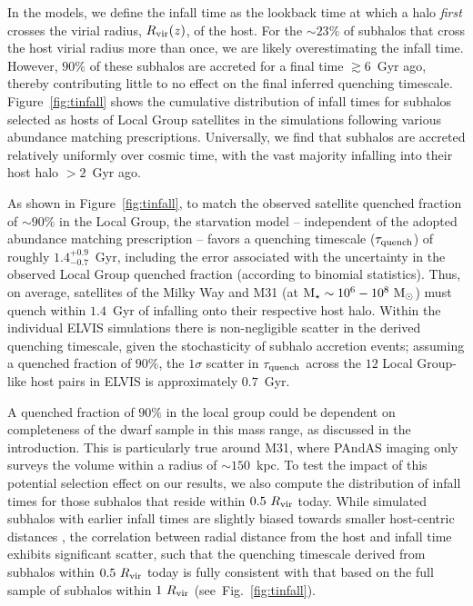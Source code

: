 In the models, we define the infall time as the lookback time at which
a halo \emph{first} crosses the virial radius, $R_{\rm vir}(z)$, of
the host. For the $\sim 23\%$ of subhalos that cross the host virial
radius more than once, we are likely overestimating the infall
time. However, $90\%$ of these subhalos are accreted for a final time
$\gtrsim6$~Gyr ago, thereby contributing little to no effect on the
final inferred quenching timescale. Figure~\ref{fig:tinfall} shows the
cumulative distribution of infall times for subhalos selected as hosts
of Local Group satellites in the simulations following various
abundance matching prescriptions. Universally, we find that subhalos
are accreted relatively uniformly over cosmic time, with the vast
majority infalling into their host halo $>2$~Gyr ago.





As shown in Figure~\ref{fig:tinfall}, to match the observed satellite
quenched fraction of $\sim90\%$ in the Local Group, the starvation
model -- independent of the adopted abundance matching prescription --
favors a quenching timescale ($\tau_{\rm quench}$) of roughly
$1.4^{+0.9}_{-0.7}$~Gyr, including the error associated with the
uncertainty in the observed Local Group quenched fraction (according
to binomial statistics). Thus, on average, satellites of the Milky Way
and M31 (at ${\rm M}_{\star} \sim 10^{6}-10^{8}~{\rm M}_{\odot}$) must quench within
$1.4$~Gyr of infalling onto their respective host halo. Within the
individual ELVIS simulations there is non-negligible scatter in the
derived quenching timescale, given the stochasticity of subhalo
accretion events; assuming a quenched fraction of $90\%$, the
$1\sigma$ scatter in $\tau_{\rm quench}$ across the $12$ Local
Group-like host pairs in ELVIS is approximately $0.7$~Gyr.
  


A quenched fraction of $90\%$ in the local group could be dependent on
completeness of the dwarf sample in this mass range, as discussed in
the introduction. This is particularly true around M31, where PAndAS
imaging only surveys the volume within a radius of $\sim150$~kpc. To
test the impact of this potential selection effect on our results, we
also compute the distribution of infall times for those subhalos that
reside within $0.5~R_{\rm vir}$ today. While simulated subhalos with
earlier infall times are slightly biased towards smaller host-centric
distances \citep[e.g.][]{diemand08, rocha12, wetzel15}, the
correlation between radial distance from the host and infall time
exhibits significant scatter, such that the quenching timescale
derived from subhalos within $0.5~R_{\rm vir}$ today is fully
consistent with that based on the full sample of subhalos within
$1~R_{\rm vir}$ (see~Fig.~\ref{fig:tinfall}).



